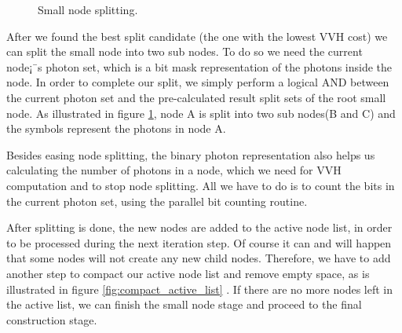 \begin{figure}[ftp] 
    \centering 
    \renewcommand{\thefigure}{\thechapter.\arabic{figure}}
    \caption[]{Small node splitting.}
    \label{fig:small_node_splitting} 
\end{figure} 

After we found the best split candidate (the one with the lowest VVH cost) we can split the small node into two sub nodes. To do so we need the current node¡¯s photon set, which is a bit mask representation of the photons inside the node. In order to complete our split, we simply perform a logical AND between the current photon set and the pre-calculated result split sets of the root small node. As illustrated in figure \ref{fig:small_node_splitting}, node A is split into two sub nodes(B and C) and the symbols represent the photons in node A. 

Besides easing node splitting, the binary photon representation also helps us calculating the number of photons in a node, which we need for VVH computation and to stop node splitting. All we have to do is to count the bits in the current photon set, using the parallel bit counting routine. 

After splitting is done, the new nodes are added to the active node list, in order to be processed during the next iteration step. Of course it can and will happen that some nodes will not create any new child nodes. Therefore, we have to add another step to compact our active node list and remove empty space, as is illustrated in figure \ref{fig:compact_active_list} \cite{Lauterbach09fastbvh}. If there are no more nodes left in the active list, we can finish the small node stage and proceed to the final construction stage. 

